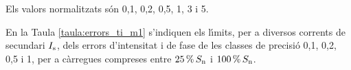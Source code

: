  Els valors normalitzats s\'{o}n 0,1, 0,2, 0,5, 1, 3 i 5.

En la Taula \vref{taula:errors_ti_m1}
s'indiquen els l\'{\i}mits, per a diversos corrents de secundari
$I_\mathrm{s}$, dels errors d'intensitat i  de fase de les classes de
precisi\'{o} 0,1, 0,2, 0,5 i 1,  per a c\`{a}rregues compreses entre
$25\mathrm{\,\%}\,S_\mathrm{n}$ i $100\mathrm{\,\%}\,S_\mathrm{n}$.

